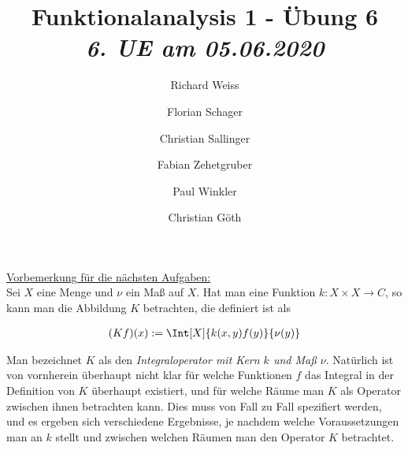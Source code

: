 \documentclass{article}
\title
{
  Funktionalanalysis 1 - Übung 6 \\
  \vspace{4pt}
  \normalsize
  \textit{6. UE am 05.06.2020}
}
\author
{
  Richard Weiss       \and
  Florian Schager     \and
  Christian Sallinger \and
  Fabian Zehetgruber  \and
  Paul Winkler        \and
  Christian Göth
}
\date{}
\begin{document}
\maketitle




\phantom{}

\underline{Vorbemerkung für die nächsten Aufgaben:} \\

Sei $X$ eine Menge und $\nu$ ein Maß auf $X$.
Hat man eine Funktion $k: X \times X \to C$, so kann man die Abbildung $K$ betrachten, die definiert ist als

\begin{align*}
  (K f)(x)
  :=
  \Int[X]{k(x, y) f(y)}{\nu(y)}
\end{align*}

Man bezeichnet $K$ als den \textit{Integraloperator mit Kern $k$ und Maß $\nu$}.
Natürlich ist von vornherein überhaupt nicht klar für welche Funktionen $f$ das Integral in der Definition von $K$ überhaupt existiert, und für welche Räume man $K$ als Operator zwischen ihnen betrachten kann.
Dies muss von Fall zu Fall spezifiert werden, und es ergeben sich verschiedene Ergebnisse, je nachdem welche Voraussetzungen man an $k$ stellt und zwischen welchen Räumen man den Operator $K$ betrachtet.






\end{document}
